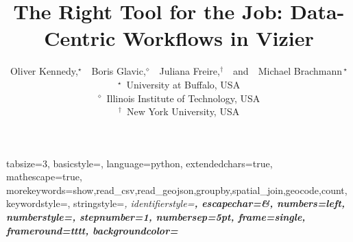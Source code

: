 \documentclass[11pt]{article}
\numberwithin{theo}{section}
\numberwithin{exam}{section}
\numberwithin{defi}{section}
\begin{document}

{
  tabsize=3,
  basicstyle=\small\upshape\ttfamily,
  language=python,
  extendedchars=true,
  mathescape=true,
  morekeywords={show,read_csv,read_geojson,groupby,spatial_join,geocode,count},
  keywordstyle=\color{Blue},
  stringstyle=\itshape\color{Sepia},
  identifierstyle=\bfseries\color{OliveGreen},
  escapechar=&,
  numbers=left,
  numberstyle=\tiny\bfseries\ttfamily\color[gray]{0.7},
  stepnumber=1,
  numbersep=5pt,
  frame=single,
  frameround=tttt,
  backgroundcolor=\color{pynotebookcellbg}
}

\lstset{style=psqlcolor}


\newcommand{\tinysection}[1]{
  \medskip \noindent \textbf{#1}.
}

\title{The Right Tool for the Job: Data-Centric Workflows in Vizier}

\author{Oliver Kennedy,$^{\star}$~~Boris Glavic,$^{\diamond}$~~Juliana Freire,$^{\dagger}$~~and~~Michael Brachmann$\,^{\star}$\\
$^{\star}$~University at Buffalo, USA\\
$^{\diamond}$~Illinois Institute of Technology, USA\\
$^{\dagger}$~New York University, USA
}

\maketitle

\graphicspath{{submissions/workflow-vizier-glavic/}}
\end{document}
